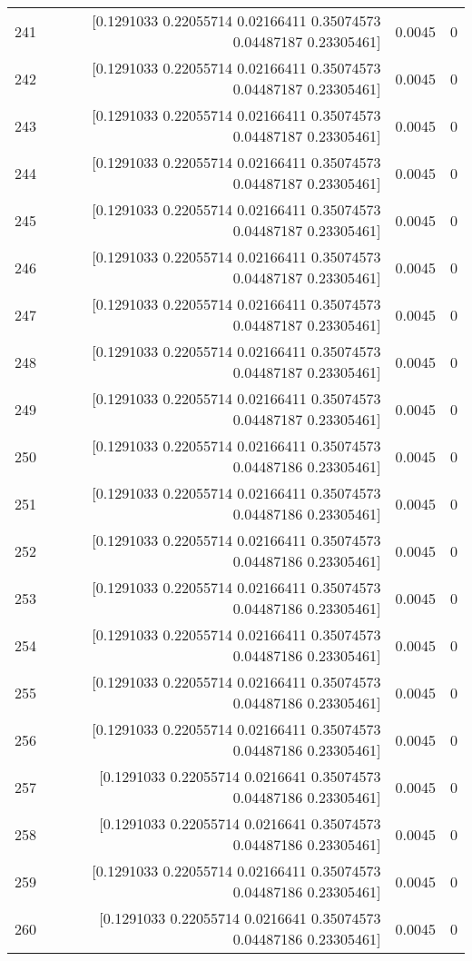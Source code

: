 \begin{longtable}{lrrr}
241 & [0.1291033  0.22055714 0.02166411 0.35074573 0.04487187 0.23305461] & 0.0045 & 0 \\
242 & [0.1291033  0.22055714 0.02166411 0.35074573 0.04487187 0.23305461] & 0.0045 & 0 \\
243 & [0.1291033  0.22055714 0.02166411 0.35074573 0.04487187 0.23305461] & 0.0045 & 0 \\
244 & [0.1291033  0.22055714 0.02166411 0.35074573 0.04487187 0.23305461] & 0.0045 & 0 \\
245 & [0.1291033  0.22055714 0.02166411 0.35074573 0.04487187 0.23305461] & 0.0045 & 0 \\
246 & [0.1291033  0.22055714 0.02166411 0.35074573 0.04487187 0.23305461] & 0.0045 & 0 \\
247 & [0.1291033  0.22055714 0.02166411 0.35074573 0.04487187 0.23305461] & 0.0045 & 0 \\
248 & [0.1291033  0.22055714 0.02166411 0.35074573 0.04487187 0.23305461] & 0.0045 & 0 \\
249 & [0.1291033  0.22055714 0.02166411 0.35074573 0.04487187 0.23305461] & 0.0045 & 0 \\
250 & [0.1291033  0.22055714 0.02166411 0.35074573 0.04487186 0.23305461] & 0.0045 & 0 \\
251 & [0.1291033  0.22055714 0.02166411 0.35074573 0.04487186 0.23305461] & 0.0045 & 0 \\
252 & [0.1291033  0.22055714 0.02166411 0.35074573 0.04487186 0.23305461] & 0.0045 & 0 \\
253 & [0.1291033  0.22055714 0.02166411 0.35074573 0.04487186 0.23305461] & 0.0045 & 0 \\
254 & [0.1291033  0.22055714 0.02166411 0.35074573 0.04487186 0.23305461] & 0.0045 & 0 \\
255 & [0.1291033  0.22055714 0.02166411 0.35074573 0.04487186 0.23305461] & 0.0045 & 0 \\
256 & [0.1291033  0.22055714 0.02166411 0.35074573 0.04487186 0.23305461] & 0.0045 & 0 \\
257 & [0.1291033  0.22055714 0.0216641  0.35074573 0.04487186 0.23305461] & 0.0045 & 0 \\
258 & [0.1291033  0.22055714 0.0216641  0.35074573 0.04487186 0.23305461] & 0.0045 & 0 \\
259 & [0.1291033  0.22055714 0.02166411 0.35074573 0.04487186 0.23305461] & 0.0045 & 0 \\
260 & [0.1291033  0.22055714 0.0216641  0.35074573 0.04487186 0.23305461] & 0.0045 & 0 \\

\end{longtable}
